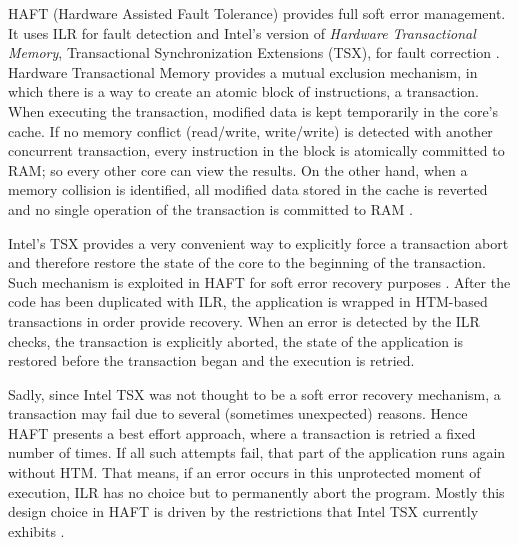 HAFT (Hardware Assisted Fault Tolerance) provides full soft error management. It uses ILR for fault detection and Intel's version of \textit{Hardware Transactional Memory}, Transactional Synchronization Extensions (TSX), for fault correction \cite{kuvaiskii2016haft}. Hardware Transactional Memory provides a mutual exclusion mechanism, in which there is a way to create an atomic block of instructions, a transaction. When executing the transaction, modified data is kept temporarily in the core's cache. If no memory conflict (read/write, write/write) is detected with another concurrent transaction, every instruction in the block is atomically committed to RAM; so every other core can view the results. On the other hand, when a memory collision is identified, all modified data stored in the cache is reverted and no single operation of the transaction is committed to RAM \cite{herlihy1993transactional}. 

Intel's TSX provides a very convenient way to explicitly force a transaction abort and therefore restore the state of the core to the beginning of the transaction. Such mechanism is exploited in HAFT for soft error recovery purposes \cite{kuvaiskii2016haft}. After the code has been duplicated with ILR, the application is wrapped in HTM-based transactions in order provide recovery. When an error is detected by the ILR checks, the transaction is explicitly aborted, the state of the application is restored before the transaction began and the execution is retried.

Sadly, since Intel TSX was not thought to be a soft error recovery mechanism, a transaction may fail due to several (sometimes unexpected) reasons. Hence HAFT presents a best effort approach, where a transaction is retried a fixed number of times. If all such attempts fail, that part of the application runs again without HTM. That means, if an error occurs in this unprotected moment of execution, ILR has no choice but to permanently abort the program. Mostly this design choice in HAFT is driven by the restrictions that Intel TSX currently exhibits \cite{kuvaiskii2016haft}. %

